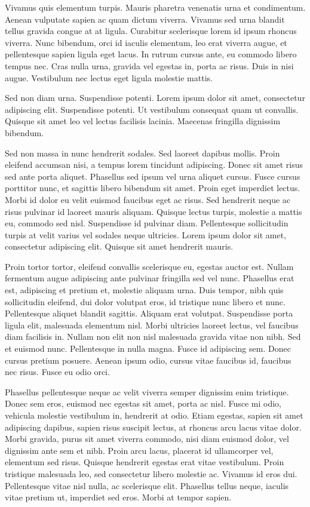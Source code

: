 \documentclass[a4paper]{article}
\begin{document}
Vivamus quis elementum turpis. Mauris pharetra venenatis urna et condimentum. Aenean vulputate sapien ac quam dictum viverra. Vivamus sed urna blandit tellus gravida congue at at ligula. Curabitur scelerisque lorem id ipsum rhoncus viverra. Nunc bibendum, orci id iaculis elementum, leo erat viverra augue, et pellentesque sapien ligula eget lacus. In rutrum cursus ante, eu commodo libero tempus nec. Cras nulla urna, gravida vel egestas in, porta ac risus. Duis in nisi augue. Vestibulum nec lectus eget ligula molestie mattis.

Sed non diam urna. Suspendisse potenti. Lorem ipsum dolor sit amet, consectetur adipiscing elit. Suspendisse potenti. Ut vestibulum consequat quam ut convallis. Quisque sit amet leo vel lectus facilisis lacinia. Maecenas fringilla dignissim bibendum.

Sed non massa in nunc hendrerit sodales. Sed laoreet dapibus mollis. Proin eleifend accumsan nisi, a tempus lorem tincidunt adipiscing. Donec sit amet risus sed ante porta aliquet. Phasellus sed ipsum vel urna aliquet cursus. Fusce cursus porttitor nunc, et sagittis libero bibendum sit amet. Proin eget imperdiet lectus. Morbi id dolor eu velit euismod faucibus eget ac risus. Sed hendrerit neque ac risus pulvinar id laoreet mauris aliquam. Quisque lectus turpis, molestie a mattis eu, commodo sed nisl. Suspendisse id pulvinar diam. Pellentesque sollicitudin turpis at velit varius vel sodales neque ultricies. Lorem ipsum dolor sit amet, consectetur adipiscing elit. Quisque sit amet hendrerit mauris.

Proin tortor tortor, eleifend convallis scelerisque eu, egestas auctor est. Nullam fermentum augue adipiscing ante pulvinar fringilla sed vel nunc. Phasellus erat est, adipiscing et pretium et, molestie aliquam urna. Duis tempor, nibh quis sollicitudin eleifend, dui dolor volutpat eros, id tristique nunc libero et nunc. Pellentesque aliquet blandit sagittis. Aliquam erat volutpat. Suspendisse porta ligula elit, malesuada elementum nisl. Morbi ultricies laoreet lectus, vel faucibus diam facilisis in. Nullam non elit non nisl malesuada gravida vitae non nibh. Sed et euismod nunc. Pellentesque in nulla magna. Fusce id adipiscing sem. Donec cursus pretium posuere. Aenean ipsum odio, cursus vitae faucibus id, faucibus nec risus. Fusce eu odio orci.

Phasellus pellentesque neque ac velit viverra semper dignissim enim tristique. Donec sem eros, euismod nec egestas sit amet, porta ac nisl. Fusce mi odio, vehicula molestie vestibulum in, hendrerit at odio. Etiam egestas, sapien sit amet adipiscing dapibus, sapien risus suscipit lectus, at rhoncus arcu lacus vitae dolor. Morbi gravida, purus sit amet viverra commodo, nisi diam euismod dolor, vel dignissim ante sem et nibh. Proin arcu lacus, placerat id ullamcorper vel, elementum sed risus. Quisque hendrerit egestas erat vitae vestibulum. Proin tristique malesuada leo, sed consectetur libero molestie ac. Vivamus id eros dui. Pellentesque vitae nisl nulla, ac scelerisque elit. Phasellus tellus neque, iaculis vitae pretium ut, imperdiet sed eros. Morbi at tempor sapien.
\end{document}
